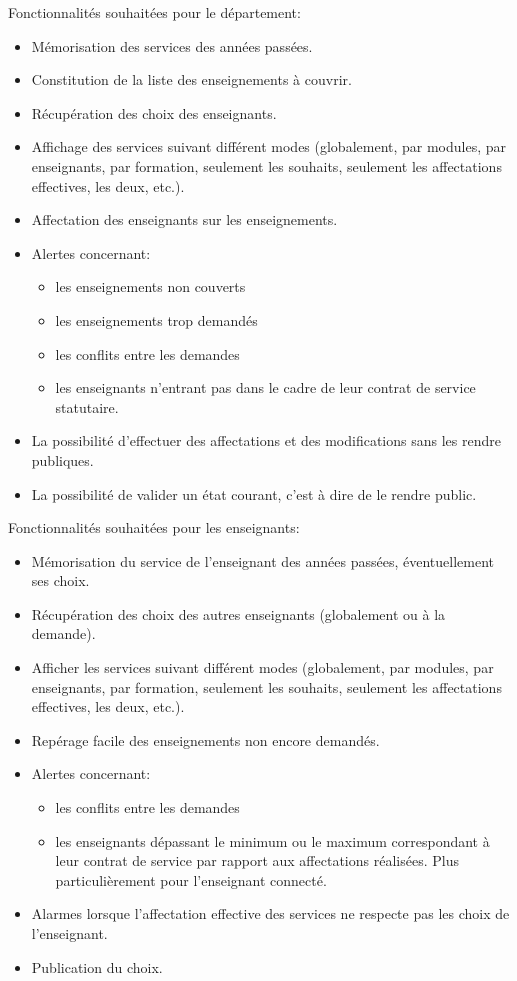 Fonctionnalités souhaitées pour le département:
\begin{itemize}
	\item Mémorisation des services des années passées.
	\item Constitution de la liste des enseignements à couvrir.
	\item Récupération des choix des enseignants.
	\item Affichage des services suivant différent modes (globalement, par modules, par enseignants, par formation, seulement les souhaits, seulement les affectations effectives, les deux, etc.).
	\item Affectation des enseignants sur les enseignements.
	\item Alertes concernant:
\begin{itemize}
	\item les enseignements non couverts
	\item les enseignements trop demandés
	\item les conflits entre les demandes
	\item les enseignants n’entrant pas dans le cadre de leur contrat de service statutaire.
\end{itemize}
	\item La possibilité d’effectuer des affectations et des modifications sans les rendre publiques.
	\item La possibilité de valider un état courant, c'est à dire de le rendre public.
\end{itemize}

Fonctionnalités souhaitées pour les enseignants:

\begin{itemize}
	\item Mémorisation du service de l’enseignant des années passées, éventuellement ses choix.
	\item Récupération des choix des autres enseignants (globalement ou à la demande).
	\item Afficher les services suivant différent modes (globalement, par modules, par enseignants, par formation, seulement les souhaits, seulement les affectations effectives, les deux, etc.).
	\item Repérage facile des enseignements non encore demandés.
	\item Alertes concernant:
	\begin{itemize}
		\item les conflits entre les demandes
		\item les enseignants dépassant le minimum ou le maximum correspondant à leur contrat de service par rapport aux affectations réalisées. 
	Plus particulièrement pour l’enseignant connecté.
	\end{itemize}
	\item Alarmes lorsque l’affectation effective des services ne respecte pas les choix de l’enseignant.
	\item Publication du choix.
\end{itemize}


